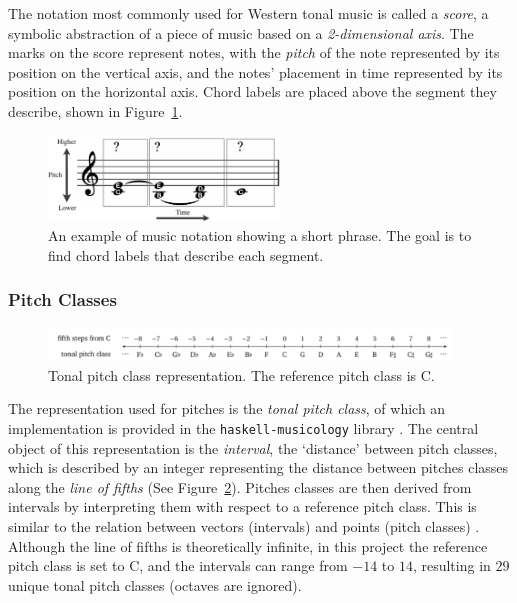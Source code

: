 \documentclass[12pt,a4paper,twoside,openany]{report} \usepackage[pdfborder={0 0 0}]{hyperref}    %
\theoremstyle{definition} \newtheorem{definition}{Definition}[section]
\begin{document}
The notation most commonly used for Western tonal music is called a \textit{score}, a symbolic abstraction of a piece of music based on a \textit{2-dimensional axis}.
The marks on the score represent notes, with the \textit{pitch} of the note represented by its position on the vertical
axis, and the notes' placement in time represented by its position on the horizontal axis. Chord labels are placed above
the segment they describe, shown in Figure~\ref{fig:pitchTime}.

\begin{figure}[ht] 
\centering \includegraphics[width=0.55\textwidth]{prep/inferringHarmony/pitchTime.pdf}
\captionsetup{width=.7\linewidth} \caption{An example of music notation showing a short phrase. The goal is to find
chord labels that describe each segment.}
\label{fig:pitchTime} 
\end{figure} 

\subsubsection{Pitch Classes}
\label{sub:pitches}

\begin{figure}[ht]
  \begin{center}
    \includegraphics[width=0.95\textwidth]{figs/intro/tpc.png}
  \end{center}
  \caption{Tonal pitch class representation. The reference pitch class is C.}
  \label{fig:tpc}
\end{figure}
The representation used for pitches is the \textit{tonal pitch class}, of which an implementation is provided in the
\texttt{haskell-musicology} library \cite{finkensiepHaskellmusicologyScientificMusic2019}. The central object of this
representation is the \textit{interval}, the `distance' between pitch classes, which is described by an integer
representing the distance between pitches classes
along the \textit{line of fifths} (See Figure~\ref{fig:tpc}). Pitches classes are then derived from intervals by
interpreting them with respect to a reference pitch class.
This is similar to the relation between vectors (intervals) and points (pitch classes)
\cite{finkensiepHaskellmusicologyScientificMusic2019}. Although the line of fifths is theoretically infinite, in this
project the reference pitch class is set to C, and the intervals can range from $-14$ to $14$, resulting in $29$ unique tonal pitch
classes (octaves are ignored).
\end{document}
